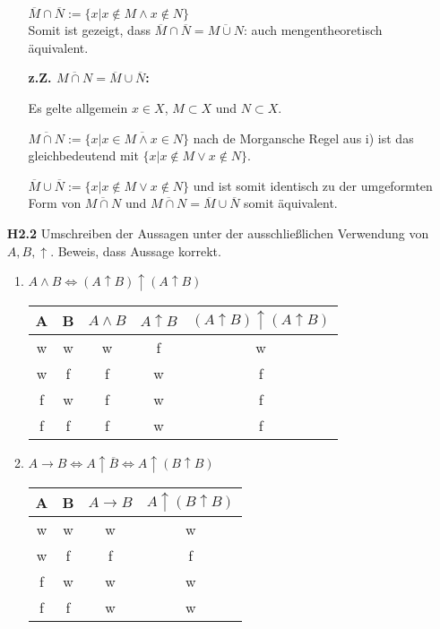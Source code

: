 \documentclass[a4paper,abstract,german]{scrreprt}
\begin{document}
\begin{enumerate}
\begin{enumerate}
       $\overline{M} \cap \overline{N} := \{ x |x \notin M \land x \notin N \}$ \\ 
        
         Somit ist gezeigt, dass $\overline{M} \cap \overline{N} = \overline{M \cup N}$: auch mengentheoretisch äquivalent.
         
         \bigskip
         \textbf{z.Z.
         $\overline{M \cap N} = \overline{M} \cup \overline{N}$:}
         
         Es gelte allgemein $x\in X$, $M \subset X$ und $N \subset X$.
         
         $\overline{M \cap N} := \{x| \overline{x \in M \land x \in N} \}$ nach de Morgansche Regel aus i) ist das gleichbedeutend mit $\{x| x \notin M \lor x \notin N \}$. 
         
        $\overline{M} \cup \overline{N} := \{x|x \notin M \lor x \notin N\}$ und ist somit identisch zu der umgeformten Form von $\overline{M \cap N}$ und  $\overline{M \cap N} = \overline{M} \cup \overline{N}$ somit äquivalent.

	\end{enumerate}
	\item[\textbf {H2.2}]
	Umschreiben der Aussagen unter der ausschließlichen Verwendung von $A, B, \uparrow$. Beweis, dass Aussage korrekt.
	\begin{enumerate}
	\item $ A \land B \iff (A \uparrow B) \uparrow(A \uparrow B)$
	
	\begin{center}
        \begin{tabular}{||c c | c | c | c ||}
         A & B & $ A \land B$ & $A \uparrow B$ & $(A \uparrow B) \uparrow(A \uparrow B)$  \\
         \hline
         w & w & w & f & w \\
         w & f & f & w & f \\
         f & w & f & w & f \\
         f & f & f & w & f \\
        \end{tabular}
        \end{center}
    	
    	
    \item
    	$ A \rightarrow B \iff A \uparrow \overline{B} \iff A \uparrow (B \uparrow B) $ \\
    		\begin{center}
        \begin{tabular}{||c c | c | c ||}
         A & B & $ A \rightarrow B$ & $A \uparrow (B \uparrow B)$  \\
         \hline
         w & w & w & w \\
         w & f & f & f \\
         f & w & w & w \\
         f & f & w & w  \\
        \end{tabular}
        \end{center}
        

\end{enumerate}
\end{enumerate}
\end{document}
